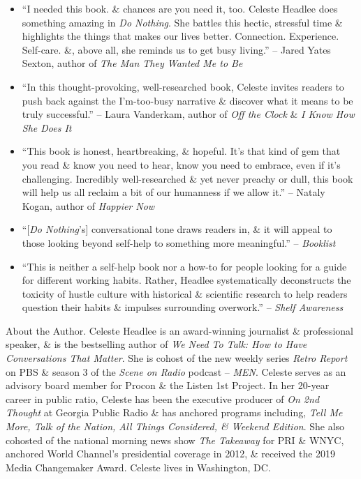 \documentclass{article}
\begin{document}
\begin{enumerate}
\begin{itemize}
		\item ``I needed this book. \& chances are you need it, too. {\sc Celeste Headlee} does something amazing in {\it Do Nothing}. She battles this hectic, stressful time \& highlights the things that makes our lives better. Connection. Experience. Self-care. \&, above all, she reminds us to get busy living.'' -- {\sc Jared Yates Sexton}, author of {\it The Man They Wanted Me to Be}
		\item ``In this thought-provoking, well-researched book, {\sc Celeste} invites readers to push back against the I'm-too-busy narrative \& discover what it means to be truly successful.'' -- {\sc Laura Vanderkam}, author of {\it Off the Clock} \& {\it I Know How She Does It}
		\item ``This book is honest, heartbreaking, \& hopeful. It's that kind of gem that you read \& know you need to hear, know you need to embrace, even if it's challenging. Incredibly well-researched \& yet never preachy or dull, this book will help us all reclaim a bit of our humanness if we allow it.'' -- {\sc Nataly Kogan}, author of {\it Happier Now}
		\item ``[{\it Do Nothing}'s] conversational tone draws readers in, \& it will appeal to those looking beyond self-help to something more meaningful.'' -- {\it Booklist}
		\item ``This is neither a self-help book nor a how-to for people looking for a guide for different working habits. Rather, {\sc Headlee} systematically deconstructs the toxicity of hustle culture with historical \& scientific research to help readers question their habits \& impulses surrounding overwork.'' -- {\it Shelf Awareness}
	\end{itemize}
	{\sf About the Author.} {\sc Celeste Headlee} is an award-winning journalist \& professional speaker, \& is the bestselling author of {\it We Need To Talk: How to Have Conversations That Matter}. She is cohost of the new weekly series {\it Retro Report} on PBS \& season 3 of the {\it Scene on Radio} podcast -- {\it MEN}. {\sc Celeste} serves as an advisory board member for Procon \& the Listen 1st Project. In her 20-year career in public ratio, {\sc Celeste} has been the executive producer of {\it On 2nd Thought} at Georgia Public Radio \& has anchored programs including, {\it Tell Me More, Talk of the Nation, All Things Considered, \& Weekend Edition}. She also cohosted of the national morning news show {\it The Takeaway} for PRI \& WNYC, anchored World Channel's presidential coverage in 2012, \& received the 2019 Media Changemaker Award. {\sc Celeste} lives in Washington, DC.
	

\end{enumerate}
\end{document}
